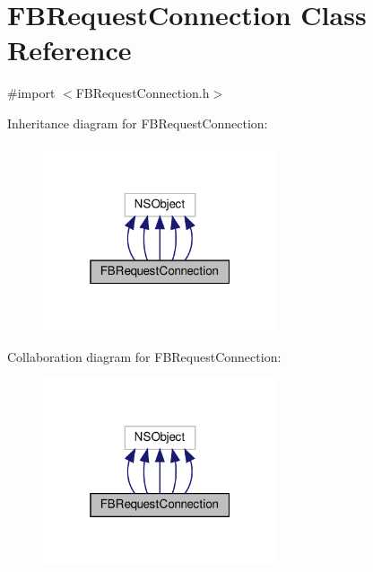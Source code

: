 \hypertarget{interfaceFBRequestConnection}{}\section{F\+B\+Request\+Connection Class Reference}
\label{interfaceFBRequestConnection}


{\ttfamily \#import $<$F\+B\+Request\+Connection.\+h$>$}



Inheritance diagram for F\+B\+Request\+Connection\+:
\nopagebreak
\begin{figure}[H]
\begin{center}
\leavevmode
\includegraphics[width=196pt]{interfaceFBRequestConnection__inherit__graph}
\end{center}
\end{figure}


Collaboration diagram for F\+B\+Request\+Connection\+:
\nopagebreak
\begin{figure}[H]
\begin{center}
\leavevmode
\includegraphics[width=196pt]{interfaceFBRequestConnection__coll__graph}
\end{center}
\end{figure}
